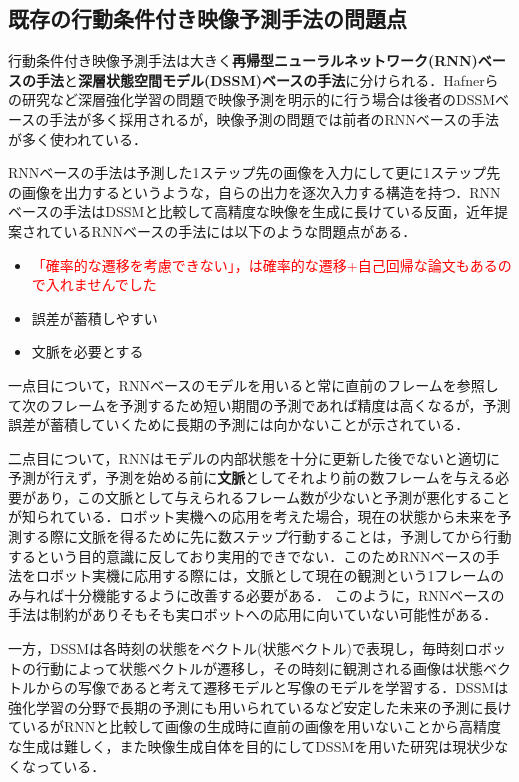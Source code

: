\subsection{既存の行動条件付き映像予測手法の問題点}

行動条件付き映像予測手法は大きく{\bf 再帰型ニューラルネットワーク(RNN)ベースの手法}と{\bf 深層状態空間モデル(DSSM)ベースの手法}に分けられる．Hafnerら\cite{hafner2019planet}の研究など深層強化学習の問題で映像予測を明示的に行う場合は後者のDSSMベースの手法が多く採用されるが，映像予測の問題では前者のRNNベースの手法が多く使われている\cite{denton2018stochastic}\cite{villegas2019high}．

RNNベースの手法は予測した1ステップ先の画像を入力にして更に1ステップ先の画像を出力するというような，自らの出力を逐次入力する構造を持つ．RNNベースの手法はDSSMと比較して高精度な映像を生成に長けている反面，近年提案されているRNNベースの手法には以下のような問題点がある．

\begin{itemize}
    \item \textcolor{red}{「確率的な遷移を考慮できない」，は確率的な遷移+自己回帰な論文もあるので入れませんでした}
    \item 誤差が蓄積しやすい
    \item 文脈を必要とする
\end{itemize}

一点目について，RNNベースのモデルを用いると常に直前のフレームを参照して次のフレームを予測するため短い期間の予測であれば精度は高くなるが，予測誤差が蓄積していくために長期の予測には向かないことが示されている\cite{hafner2019planet}．

二点目について，RNNはモデルの内部状態を十分に更新した後でないと適切に予測が行えず，予測を始める前に{\bf 文脈}としてそれより前の数フレームを与える必要があり，この文脈として与えられるフレーム数が少ないと予測が悪化することが知られている\cite{villegas2019high}．ロボット実機への応用を考えた場合，現在の状態から未来を予測する際に文脈を得るために先に数ステップ行動することは，予測してから行動するという目的意識に反しており実用的できでない．このためRNNベースの手法をロボット実機に応用する際には，文脈として現在の観測という1フレームのみ与れば十分機能するように改善する必要がある．
このように，RNNベースの手法は制約がありそもそも実ロボットへの応用に向いていない可能性がある．

一方，DSSMは各時刻の状態をベクトル(状態ベクトル)で表現し，毎時刻ロボットの行動によって状態ベクトルが遷移し，その時刻に観測される画像は状態ベクトルからの写像であると考えて遷移モデルと写像のモデルを学習する．DSSMは強化学習の分野で長期の予測にも用いられているなど安定した未来の予測に長けているがRNNと比較して画像の生成時に直前の画像を用いないことから高精度な生成は難しく，また映像生成自体を目的にしてDSSMを用いた研究は現状少なくなっている．

